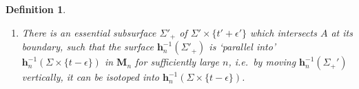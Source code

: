 \documentclass{amsart}
\newtheorem{definition}[theorem]{Definition}
\theoremstyle{definition}
\newcommand{\Int}{\operatorname{Int}}
\newcommand{\Fr}{\operatorname{Fr}}
\newcommand{\ie}{i.e.\ }
\newcommand{\Image}{\operatorname{Im}}
\newcommand\HHH{{\mathbb H}}
\begin{document}
\begin{definition}
\begin{enumerate}
\begin{enumerate}
		\item There is an essential subsurface $\Sigma'_+$ of $\Sigma' \times \{t'+\epsilon'\}$ which intersects $A$ at its boundary,  such that   the surface $\mathbf h_n^{-1}(\Sigma'_+)$  is \lq parallel into'  $\mathbf h_n^{-1}(\Sigma \times \{t-\epsilon\})$  in $\mathbf M_n$ for sufficiently large $n$, \ie  by moving $\mathbf{h}_n^{-1}(\Sigma_+')$ vertically, it can be isotoped into $\mathbf{h}_n^{-1}(\Sigma \times \{t-\epsilon\})$. 
		\end{enumerate}

\end{enumerate}
\end{definition}
\end{document}
